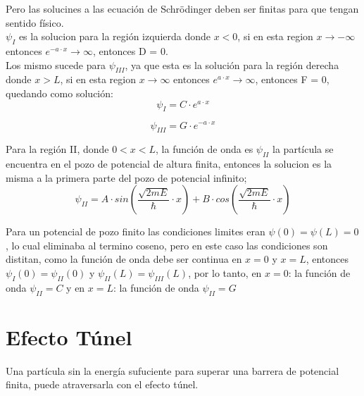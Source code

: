 \documentclass[a4paper]{article}
\begin{document}
            \indent Pero las solucines a las ecuación de Schrödinger deben ser finitas para que tengan sentido físico.\\
            \indent $\psi_I$  es la solucion para la región izquierda donde $x < 0$, si en esta region $x \rightarrow -\infty$ entonces $e^{-a \cdot x} \rightarrow \infty$, entonces D = 0.\\
            \indent Los mismo sucede para $\psi_{III}$, ya que esta es la solución para la región derecha donde $x > L$, si en esta region $x \rightarrow \infty$ entonces $e^{a \cdot x} \rightarrow \infty$, entonces F = 0, quedando como solución:\\

            \begin{equation}
                \psi_I = C \cdot e^{a \cdot x}
            \end{equation}

            \begin{equation}
                \psi_{III} = G \cdot e^{-a \cdot x} 
            \end{equation}

            \indent Para la región II, donde $0 < x < L$, la función de onda es $\psi_{II}$
            la partícula se encuentra en el pozo de potencial de altura finita, entonces la solucion es la misma a la primera parte del pozo de potencial infinito;\\

            \begin{equation}
                \psi_{II} = A \cdot sin(\frac{\sqrt{2mE}}{\hbar} \cdot x) + B \cdot cos(\frac{\sqrt{2mE}}{\hbar} \cdot x)
            \end{equation}

            \indent Para un potencial de pozo finito las condiciones limites eran $\psi(0) = \psi(L) = 0$, lo cual eliminaba al termino coseno, pero en este caso las condiciones son distitan, como la función de onda debe ser continua en $x = 0$ y $x = L$, entonces $\psi_I(0) = \psi_{II}(0)$ y $\psi_{II}(L) = \psi_{III}(L)$, por lo tanto, en $x = 0$: la función de onda $\psi_{II} = C$ y en $x = L$: la función de onda $\psi_{II} = G$

    \section{Efecto Túnel}

            \indent Una partícula sin la energía sufuciente para superar una barrera de potencial finita, puede atraversarla con el efecto túnel.\\
\end{document}
